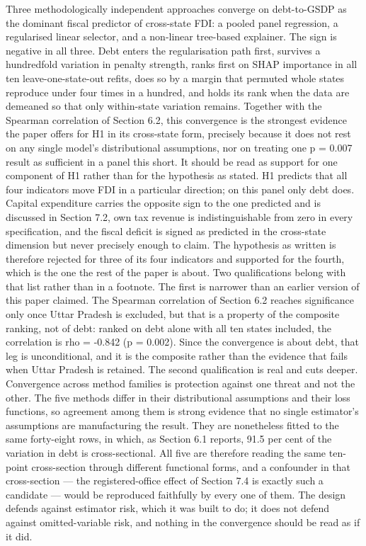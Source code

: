 \documentclass[12pt,a4paper]{article}
\begin{document}
Three methodologically independent approaches converge on debt-to-GSDP as the dominant fiscal predictor of cross-state FDI: a pooled panel regression, a regularised linear selector, and a non-linear tree-based explainer. The sign is negative in all three. Debt enters the regularisation path first, survives a hundredfold variation in penalty strength, ranks first on SHAP importance in all ten leave-one-state-out refits, does so by a margin that permuted whole states reproduce under four times in a hundred, and holds its rank when the data are demeaned so that only within-state variation remains. Together with the Spearman correlation of Section 6.2, this convergence is the strongest evidence the paper offers for H1 in its cross-state form, precisely because it does not rest on any single model's distributional assumptions, nor on treating one p = 0.007 result as sufficient in a panel this short. It should be read as support for one component of H1 rather than for the hypothesis as stated. H1 predicts that all four indicators move FDI in a particular direction; on this panel only debt does. Capital expenditure carries the opposite sign to the one predicted and is discussed in Section 7.2, own tax revenue is indistinguishable from zero in every specification, and the fiscal deficit is signed as predicted in the cross-state dimension but never precisely enough to claim. The hypothesis as written is therefore rejected for three of its four indicators and supported for the fourth, which is the one the rest of the paper is about. Two qualifications belong with that list rather than in a footnote. The first is narrower than an earlier version of this paper claimed. The Spearman correlation of Section 6.2 reaches significance only once Uttar Pradesh is excluded, but that is a property of the composite ranking, not of debt: ranked on debt alone with all ten states included, the correlation is rho = -0.842 (p = 0.002). Since the convergence is about debt, that leg is unconditional, and it is the composite rather than the evidence that fails when Uttar Pradesh is retained. The second qualification is real and cuts deeper. Convergence across method families is protection against one threat and not the other. The five methods differ in their distributional assumptions and their loss functions, so agreement among them is strong evidence that no single estimator's assumptions are manufacturing the result. They are nonetheless fitted to the same forty-eight rows, in which, as Section 6.1 reports, 91.5 per cent of the variation in debt is cross-sectional. All five are therefore reading the same ten-point cross-section through different functional forms, and a confounder in that cross-section --- the registered-office effect of Section 7.4 is exactly such a candidate --- would be reproduced faithfully by every one of them. The design defends against estimator risk, which it was built to do; it does not defend against omitted-variable risk, and nothing in the convergence should be read as if it did.
\end{document}
